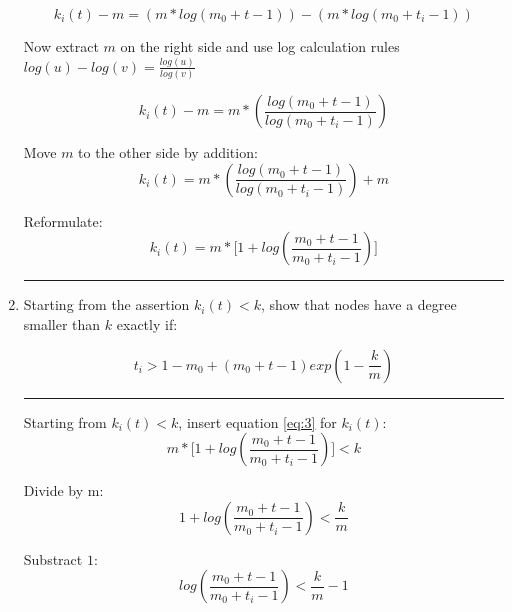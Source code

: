 \begin{enumerate}
	\begin{equation*}
		k_i(t) - m = (m * log(m_0 + t - 1)) - (m * log(m_0 + t_i - 1))
	\end{equation*}
	
	Now extract $m$ on the right side and use log calculation rules $log(u) - log(v) = \frac{log(u)}{log(v)}$
	
	\begin{equation*}
		k_i(t) - m = m * (\frac{log(m_0 + t - 1)}{log(m_0 + t_i - 1)})
	\end{equation*}
	
	Move $m$ to the other side by addition:
	\begin{equation*}
		k_i(t) = m * (\frac{log(m_0 + t - 1)}{log(m_0 + t_i - 1)}) + m
	\end{equation*}

	Reformulate:
	\begin{equation*}
		k_i(t) = m * \biggl[1 + log(\frac{m_0 + t - 1}{m_0 + t_i - 1})\biggr]
	\end{equation*}
	
	\hrule \relax
	
	\item Starting from the assertion $k_i(t) < k$, show that nodes have a degree smaller than $k$ exactly if:
	
	\begin{equation} \label{eq:4}
		t_i > 1 - m_0 + (m_0 + t - 1) exp(1 - \frac{k}{m})
	\end{equation}
	
	\hrule \relax
	
	Starting from $k_i(t) < k$, insert equation \ref{eq:3} for $k_i(t)$:
	\begin{equation*}
		 m * \biggl[1 + log(\frac{m_0 + t - 1}{m_0 + t_i - 1})\biggr] < k
	\end{equation*}
	
	Divide by m:
	\begin{equation*}
		1 + log(\frac{m_0 + t - 1}{m_0 + t_i - 1}) < \frac{k}{m}
	\end{equation*}
	
	Substract $1$:
	\begin{equation*}
		log(\frac{m_0 + t - 1}{m_0 + t_i - 1}) < \frac{k}{m} - 1
	\end{equation*}
	
	

\end{enumerate}
